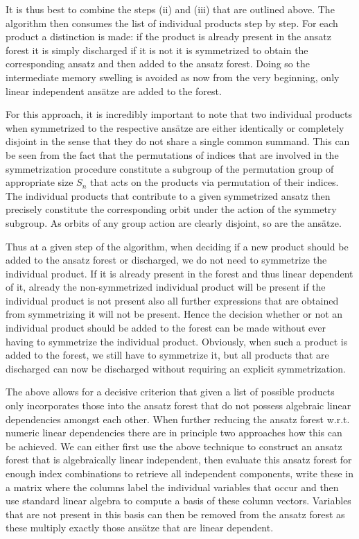 \documentclass[a4paper,12pt, DIV=14, BCOR=5mm, twoside, headsepline, numbers=noenddot]{scrbook}
\begin{document}
It is thus best to combine the steps (ii) and (iii) that are outlined above. The algorithm then consumes the list of individual products step by step. For each product a distinction is made: if the product is already present in the ansatz forest it is simply discharged if it is not it is symmetrized to obtain the corresponding ansatz and then added to the ansatz forest. Doing so the intermediate memory swelling is avoided as now from the very beginning, only linear independent ansätze are added to the forest.

For this approach, it is incredibly important to note that two individual products when symmetrized to the respective ansätze are either identically or completely disjoint in the sense that they do not share a single common summand. This can be seen from the fact that the permutations of indices that are involved in the symmetrization procedure constitute a subgroup of the permutation group of appropriate size $S_n$ that acts on the products via permutation of their indices. The individual products that contribute to a given symmetrized ansatz then precisely constitute the corresponding orbit under the action of the symmetry subgroup. As orbits of any group action are clearly disjoint, so are the ansätze. 

Thus at a given step of the algorithm, when deciding if a new product should be added to the ansatz forest or discharged, we do not need to symmetrize the individual product. If it is already present in the forest and thus linear dependent of it, already the non-symmetrized individual product will be present if the individual product is not present also all further expressions that are obtained from symmetrizing it will not be present. Hence the decision whether or not an individual product should be added to the forest can be made without ever having to symmetrize the individual product. Obviously, when such a product is added to the forest, we still have to symmetrize it, but all products that are discharged can now be discharged without requiring an explicit symmetrization.

The above allows for a decisive criterion that given a list of possible products only incorporates those into the ansatz forest that do not possess algebraic linear dependencies amongst each other. When further reducing the ansatz forest w.r.t. numeric linear dependencies there are in principle two approaches how this can be achieved. We can either first use the above technique to construct an ansatz forest that is algebraically linear independent, then evaluate this ansatz forest for enough index combinations to retrieve all independent components, write these in a matrix where the columns label the individual variables that occur and then use standard linear algebra to compute a basis of these column vectors. Variables that are not present in this basis can then be removed from the ansatz forest as these multiply exactly those ansätze that are linear dependent. 
\end{document}
